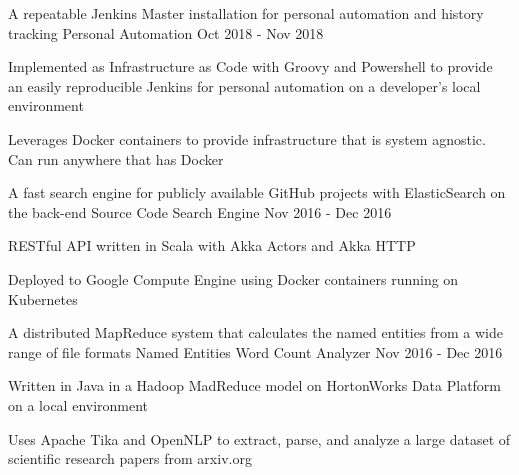 
\begin{cventries}

  \cventry
    {A repeatable Jenkins Master installation for personal automation and history tracking} %
    {Personal Automation} %
    {} %
    {Oct 2018 - Nov 2018} %
    {
      \begin{cvitems} %
        \item {Implemented as Infrastructure as Code with Groovy and Powershell to provide an easily reproducible Jenkins for personal automation on a developer's local environment}
        \item {Leverages Docker containers to provide infrastructure that is system agnostic. Can run anywhere that has Docker}
      \end{cvitems}
    }

  \cventry
    {A fast search engine for publicly available GitHub projects with ElasticSearch on the back-end} %
    {Source Code Search Engine} %
    {} %
    {Nov 2016 - Dec 2016} %
    {
      \begin{cvitems} %
        \item {RESTful API written in Scala with Akka Actors and Akka HTTP}
        \item {Deployed to Google Compute Engine using Docker containers running on Kubernetes}
      \end{cvitems}
    }

  \cventry
    {A distributed MapReduce system that calculates the named entities from a wide range of file formats} %
    {Named Entities Word Count Analyzer} %
    {} %
    {Nov 2016 - Dec 2016} %
    {
      \begin{cvitems} %
        \item {Written in Java in a Hadoop MadReduce model on HortonWorks Data Platform on a local environment}
        \item {Uses Apache Tika and OpenNLP to extract, parse, and analyze a large dataset of scientific research papers from arxiv.org}
      \end{cvitems}
    }


\end{cventries}

